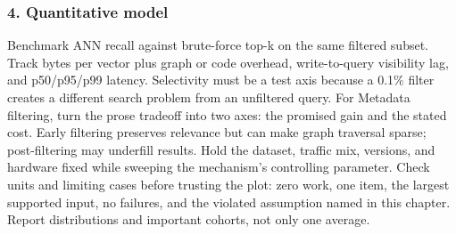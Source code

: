 \subsubsection*{4. Quantitative model}
Benchmark ANN recall against brute-force top-k on the same filtered subset. Track bytes per vector plus graph or code overhead, write-to-query visibility lag, and p50/p95/p99 latency. Selectivity must be a test axis because a 0.1\% filter creates a different search problem from an unfiltered query.
For Metadata filtering, turn the prose tradeoff into two axes: the promised gain and the stated cost. Early filtering preserves relevance but can make graph traversal sparse; post-filtering may underfill results. Hold the dataset, traffic mix, versions, and hardware fixed while sweeping the mechanism's controlling parameter.
Check units and limiting cases before trusting the plot: zero work, one item, the largest supported input, no failures, and the violated assumption named in this chapter. Report distributions and important cohorts, not only one average.
